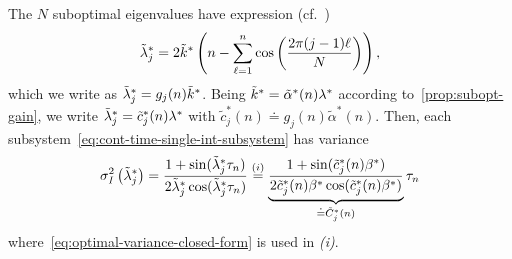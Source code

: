 
\newpage
\subsection{}\label{app:cont-time-single-int-suboptimal-variance-computation}

The $ N $ suboptimal eigenvalues have expression (cf.~\cite{circulant})
\begin{equation}\label{eq:eigenvaluesCirculant}
	\tilde{\gpos}_j^* = 2\tilde{k}^* \left(n - \sum_{\ell=1}^n\cos\left(\dfrac{2\pi (j-1) \ell}{N}\right)\right), %
\end{equation}
which we write as $ \tilde{\gpos}_j^* = g_j(n)\tilde{k}^* $.
Being $ \tilde{k}^* = \tilde{\alpha}^*(n) \opteig $
according to~\cref{prop:subopt-gain},
we write $ \tilde{\gpos}_j^* = \tilde{c}_j^*(n)\opteig $ with $  \tilde{c}_j^*(n) \doteq g_j(n)\tilde{\alpha}^*(n) $.
Then, each subsystem~\eqref{eq:cont-time-single-int-subsystem} has variance %
\begin{align}\label{eq:optimalVarianceLambda_i}
	\varx{\tilde{\lambda}_j^*}{I} = \dfrac{1+\sin(\tilde{\lambda}_j^* \taun)}{2\tilde{\lambda}_j^*\cos(\tilde{\lambda}_j^* \taun)}
	\overset{(i)}{=} \underbrace{\dfrac{1+\sin(\tilde{c}_j^*(n)\beta^*)}{2\tilde{c}_j^*(n)\beta^*\cos(\tilde{c}_j^*(n)\beta^*)}}_{\doteq\tilde{C}_{j}^*(n)}\taun 
\end{align}
where~\eqref{eq:optimal-variance-closed-form} is used in \textit{(i)}.
